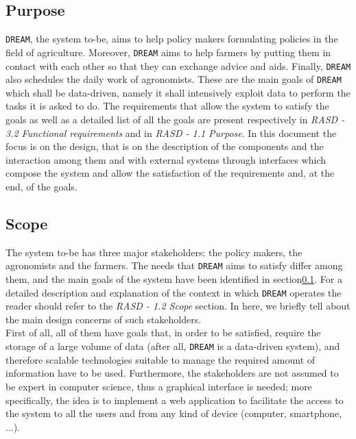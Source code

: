 \documentclass{article}
\begin{document}
\subsection{Purpose}\label{Purpose}
\verb|DREAM|, the system to-be, aims to help policy makers 
formulating policies in the field of agriculture.  Moreover, \verb|DREAM| aims to help farmers by putting them in contact with each other so that they can exchange advice and aids. Finally, \verb|DREAM| also schedules the daily work of agronomists. These are the main goals of \verb|DREAM| which shall be data-driven, namely it shall intensively exploit data to perform the tasks it is asked to do. The requirements that allow the system to satisfy the goals as well as a detailed list of all the goals are present respectively in \textit{RASD - 3.2 Functional requirements} and in \textit{RASD - 1.1 Purpose}. In this document the focus is on the design, that is on the description of the components and the interaction among them and with external systems through interfaces which compose the system and allow the satisfaction of the requirements and, at the end, of the goals.
\subsection{Scope}
The system to-be has three major stakeholders: the policy makers, the agronomists and the farmers. The needs that \verb|DREAM| aims to satisfy differ among them, and the main goals of the system have been identified in section\ref{Purpose}. For a detailed description and explanation of the context in which \verb|DREAM| operates the reader should refer to the \textit{RASD - 1.2 Scope} section. In here, we briefly tell about the main design concerns of such stakeholders.\\
First of all, all of them have goals that, in order to be satisfied, require the storage of a large volume of data (after all, \verb|DREAM| is a data-driven system), and therefore scalable technologies suitable to manage the required amount of information have to be used. Furthermore, the stakeholders are not assumed to be expert in computer science, thus a graphical interface is needed; more specifically, the idea is to implement a web application to facilitate the access to the system to all the users and from any kind of device (computer, smartphone, ...).
\end{document}
